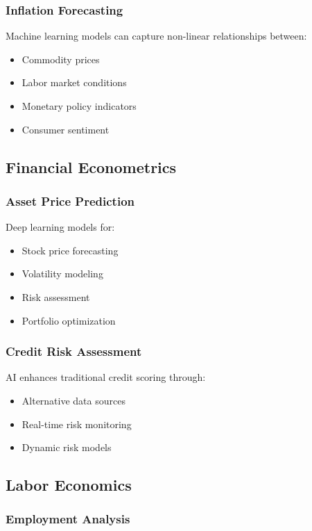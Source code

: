 \documentclass[12pt,a4paper]{article}
\begin{document}
\subsubsection{Inflation Forecasting}

Machine learning models can capture non-linear relationships between:
\begin{itemize}
    \item Commodity prices
    \item Labor market conditions
    \item Monetary policy indicators
    \item Consumer sentiment
\end{itemize}

\subsection{Financial Econometrics}

\subsubsection{Asset Price Prediction}

Deep learning models for:
\begin{itemize}
    \item Stock price forecasting
    \item Volatility modeling
    \item Risk assessment
    \item Portfolio optimization
\end{itemize}

\subsubsection{Credit Risk Assessment}

AI enhances traditional credit scoring through:
\begin{itemize}
    \item Alternative data sources
    \item Real-time risk monitoring
    \item Dynamic risk models
\end{itemize}

\subsection{Labor Economics}

\subsubsection{Employment Analysis}
\end{document}
